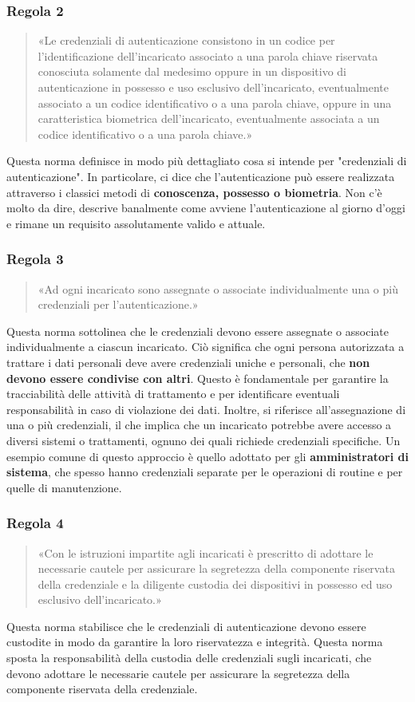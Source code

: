 \subsubsection*{Regola 2}
\begin{quote}
    «Le credenziali di autenticazione consistono in un codice per l'identificazione dell'incaricato associato a una parola chiave riservata conosciuta solamente dal medesimo oppure in un dispositivo di autenticazione in possesso e uso esclusivo dell'incaricato, eventualmente associato a un codice identificativo o a una parola chiave, oppure in una caratteristica biometrica dell'incaricato, eventualmente associata a un codice identificativo o a una parola chiave.»
\end{quote}
Questa norma definisce in modo più dettagliato cosa si intende per "credenziali di autenticazione". In particolare, ci dice che l'autenticazione può essere realizzata attraverso i classici metodi di \textbf{conoscenza, possesso o biometria}.
Non c'è molto da dire, descrive banalmente come avviene l'autenticazione al giorno d'oggi e rimane un requisito assolutamente valido e attuale.
\subsubsection*{Regola 3}
\begin{quote}
    «Ad ogni incaricato sono assegnate o associate individualmente una o più credenziali per l'autenticazione.»
\end{quote}
Questa norma sottolinea che le credenziali devono essere assegnate o associate individualmente a ciascun incaricato.
Ciò significa che ogni persona autorizzata a trattare i dati personali deve avere credenziali uniche e personali, che \textbf{non devono essere condivise con altri}.
Questo è fondamentale per garantire la tracciabilità delle attività di trattamento e per identificare eventuali responsabilità in caso di violazione dei dati.
Inoltre, si riferisce all'assegnazione di una o più credenziali, il che implica che un incaricato potrebbe avere accesso a diversi sistemi o trattamenti, ognuno dei quali richiede credenziali specifiche.
Un esempio comune di questo approccio è quello adottato per gli \textbf{amministratori di sistema}, che spesso hanno credenziali separate per le operazioni di routine e per quelle di manutenzione.
\subsubsection*{Regola 4}
\begin{quote}
    «Con le istruzioni impartite agli incaricati è prescritto di adottare le necessarie cautele per assicurare la segretezza della componente riservata della credenziale e la diligente custodia dei dispositivi in possesso ed uso esclusivo dell'incaricato.»
\end{quote}
Questa norma stabilisce che le credenziali di autenticazione devono essere custodite in modo da garantire la loro riservatezza e integrità.
Questa norma sposta la responsabilità della custodia delle credenziali sugli incaricati, che devono adottare le necessarie cautele per assicurare la segretezza della componente riservata della credenziale.
